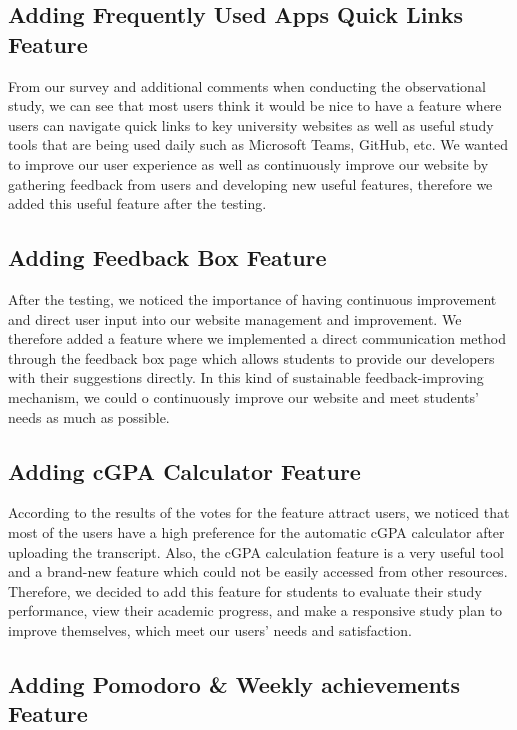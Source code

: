 \documentclass[12pt, titlepage]{article}
\begin{document}
\subsection{Adding Frequently Used Apps Quick Links Feature}\label{IAQL}
From our survey and additional comments when conducting the observational study, we can see that most users think it would be nice to have a feature where users can navigate quick links to key university websites as well as useful study tools that are being used daily such as Microsoft Teams, GitHub, etc. We wanted to improve our user experience as well as continuously improve our website by gathering feedback from users and developing new useful features, therefore we added this useful feature after the testing.

\subsection{Adding Feedback Box Feature}\label{FEEP}

After the testing, we noticed the importance of having continuous improvement and direct user input into our website management and improvement.
We therefore added a feature where we implemented a direct communication method through the feedback box page which allows students to provide our developers with their suggestions directly.  In this kind of sustainable feedback-improving mechanism, we could o continuously improve our website and meet students’ needs as much as possible.

\subsection{Adding cGPA Calculator Feature}\label{PEDC}

According to the results of the votes for the feature attract users, we noticed that most of the users have a high preference for the automatic cGPA calculator after uploading the transcript. Also, the cGPA calculation feature is a very useful tool and a brand-new feature which could not be easily accessed from other resources. Therefore, we decided to add this feature for students to evaluate their study performance, view their academic progress, and make a responsive study plan to improve themselves, which meet our users' needs and satisfaction.

\subsection{Adding Pomodoro \& Weekly achievements Feature}\label{PWAC}
\end{document}
